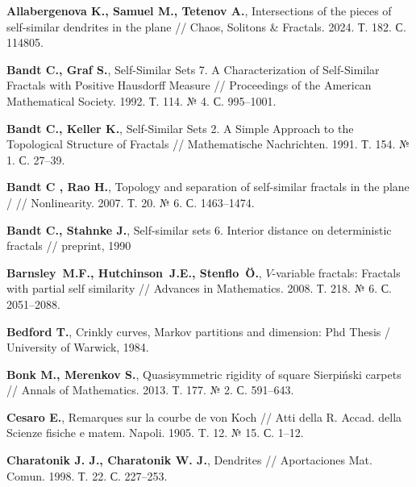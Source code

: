 %
%




\begin{thebibliography}{99}

{\bf Allabergenova K., Samuel M., Tetenov A.}, 
Intersections of the pieces of self-similar dendrites in the plane //
Chaos, Solitons \& Fractals. 2024. Т. 182. С. 114805.

{\bf Bandt C., Graf S.},
Self-Similar Sets 7. A Characterization of Self-Similar Fractals with Positive Hausdorff Measure // 
Proceedings of the American Mathematical Society. 1992. Т. 114. № 4. С. 995--1001.

{\bf Bandt C., Keller K.},
Self‐Similar Sets 2. A Simple Approach to the Topological Structure of Fractals // 
Mathematische Nachrichten. 1991. Т. 154. № 1. С. 27--39.

  {\bf Bandt C , Rao H.},
Topology and separation of self-similar fractals in the plane /  // 
Nonlinearity. 2007. Т. 20. № 6. С. 1463--1474.

{\bf Bandt C., Stahnke J.},
Self-similar sets 6. Interior distance on deterministic fractals //
preprint, 1990

{\bf Barnsley~M.F., Hutchinson~J.E., Stenflo~\"O.},
$V$-variable fractals: Fractals with partial self similarity //
Advances in Mathematics. 2008. Т. 218. № 6. С. 2051--2088.

{\bf Bedford T.},
Crinkly curves, Markov partitions and dimension: Phd Thesis / 
University of Warwick, 1984.

{\bf Bonk M., Merenkov S.}, 
Quasisymmetric rigidity of square Sierpiński carpets // 
Annals of Mathematics. 2013. Т. 177. № 2. С. 591--643.

{\bf Cesaro E.}, 
Remarques sur la courbe de von Koch // 
Atti della R. Accad. della Scienze fisiche e matem. Napoli. 1905. T. 12. № 15. С. 1--12.

{\bf Charatonik J. J., Charatonik W. J.},
Dendrites // 
Aportaciones Mat. Comun. 1998. Т. 22. С. 227--253.


\end{thebibliography}
